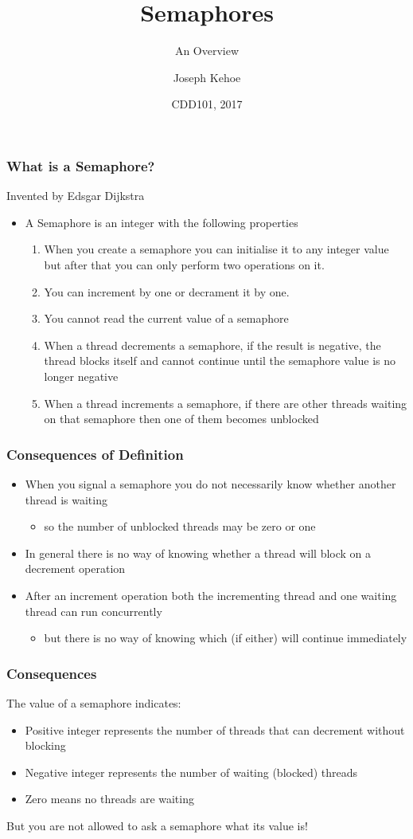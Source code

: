 \documentclass{beamer}
\title[Concurrency] %
{Semaphores}
\subtitle{An Overview}
\author[Dr. Joseph Kehoe] %
{Joseph Kehoe\inst{1}}
\institute[IT Carlow] %
{
	\inst{1}%
	Department of Computing and Networking\\
	Institute of Technology Carlow
}
\date[ITC 2017] %
{CDD101, 2017}
\begin{document}
 
\frame{\titlepage}
 
 

\begin{frame}
\frametitle{What is a Semaphore?}
Invented by Edsgar Dijkstra
\begin{itemize}
\item A Semaphore is an integer with the following properties
\begin{enumerate}
\item When you create a semaphore you can initialise it to any integer value but after that you can only perform two operations on it. 
\item You can increment by one or decrament it by one.
\item You cannot read the current value of a semaphore
\item When a thread decrements a semaphore, if the result is negative, the thread blocks itself and cannot continue until the semaphore value is no longer negative
\item When a thread increments a semaphore, if there are other threads waiting on that semaphore  then one of them becomes unblocked
\end{enumerate}
\end{itemize}
\end{frame}


\begin{frame}
\frametitle{Consequences of Definition}


\begin{itemize}
\item When you signal a semaphore you do not necessarily know whether another thread is waiting
\begin{itemize}
 \item so the number of unblocked threads may be zero or one
 \end{itemize} 
\item In general there is no way of knowing whether a thread will block on a decrement operation
\item After an increment operation both the incrementing thread and one waiting thread can run concurrently
\begin{itemize}
 \item but there is no way of knowing which (if either) will continue immediately
 \end{itemize}
\end{itemize}
\end{frame}


\begin{frame}
	\frametitle{Consequences}
  The value of a semaphore indicates:
\begin{itemize}
	\item Positive integer represents the number of threads that can decrement without blocking
\item Negative integer represents the number of waiting (blocked) threads
\item Zero means no threads are waiting
\end{itemize}
But you are not allowed to ask a semaphore what its value is!
\end{frame}
\end{document}
